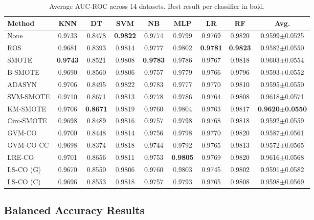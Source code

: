 \begin{table}[H]
\centering
\caption{Average AUC-ROC across 14 datasets. Best result per classifier in bold.}
\label{tab:results:auc}
\small
\begin{tabular}{lcccccccc}
\toprule
\textbf{Method} & \textbf{KNN} & \textbf{DT} & \textbf{SVM} & \textbf{NB} & \textbf{MLP} & \textbf{LR} & \textbf{RF} & \textbf{Avg.} \\
\midrule
None       & 0.9733 & 0.8478 & \textbf{0.9822} & 0.9774 & 0.9799 & 0.9769 & 0.9820 & 0.9599$\pm$0.0525 \\
ROS        & 0.9681 & 0.8393 & 0.9814 & 0.9777 & 0.9802 & \textbf{0.9781} & \textbf{0.9823} & 0.9582$\pm$0.0550 \\
SMOTE      & \textbf{0.9743} & 0.8521 & 0.9808 & \textbf{0.9783} & 0.9786 & 0.9767 & 0.9818 & 0.9603$\pm$0.0554 \\
B-SMOTE    & 0.9690 & 0.8560 & 0.9806 & 0.9757 & 0.9779 & 0.9766 & 0.9796 & 0.9593$\pm$0.0552 \\
ADASYN     & 0.9706 & 0.8495 & 0.9822 & 0.9783 & 0.9777 & 0.9770 & 0.9810 & 0.9595$\pm$0.0550 \\
SVM-SMOTE  & 0.9710 & 0.8671 & 0.9813 & 0.9778 & 0.9786 & 0.9764 & 0.9808 & 0.9618$\pm$0.0571 \\
KM-SMOTE   & 0.9706 & \textbf{0.8671} & 0.9819 & 0.9760 & 0.9804 & 0.9763 & 0.9817 & \textbf{0.9620$\pm$0.0550} \\
Circ-SMOTE & 0.9698 & 0.8489 & 0.9816 & 0.9757 & 0.9798 & 0.9768 & 0.9818 & 0.9592$\pm$0.0559 \\
\midrule
GVM-CO     & 0.9700 & 0.8448 & 0.9814 & 0.9756 & 0.9798 & 0.9770 & 0.9820 & 0.9587$\pm$0.0561 \\
GVM-CO-CC  & 0.9698 & 0.8374 & 0.9818 & 0.9744 & 0.9792 & 0.9765 & 0.9813 & 0.9572$\pm$0.0565 \\
LRE-CO     & 0.9701 & 0.8656 & 0.9811 & 0.9753 & \textbf{0.9805} & 0.9769 & 0.9820 & 0.9616$\pm$0.0568 \\
LS-CO (G)  & 0.9670 & 0.8550 & 0.9806 & 0.9760 & 0.9803 & 0.9745 & 0.9802 & 0.9591$\pm$0.0582 \\
LS-CO (C)  & 0.9696 & 0.8553 & 0.9818 & 0.9757 & 0.9793 & 0.9765 & 0.9808 & 0.9598$\pm$0.0569 \\
\bottomrule
\end{tabular}
\end{table}

\subsection{Balanced Accuracy Results}

